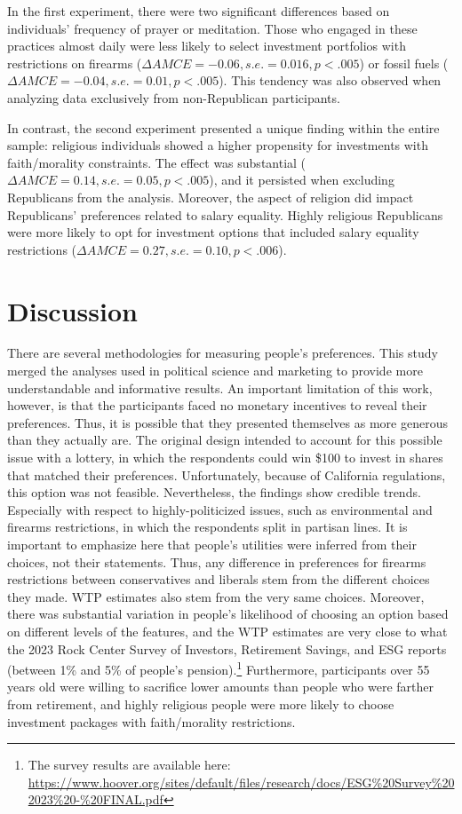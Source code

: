 \documentclass[
  12pt,
]{article}
\begin{document}
In the first experiment, there were two significant differences based on individuals' frequency of prayer or meditation. Those who engaged in these practices almost daily were less likely to select investment portfolios with restrictions on firearms (\(\Delta AMCE = -0.06, s.e. = 0.016, p<.005\)) or fossil fuels (\(\Delta AMCE = -0.04, s.e. = 0.01, p<.005\)). This tendency was also observed when analyzing data exclusively from non-Republican participants.

In contrast, the second experiment presented a unique finding within the entire sample: religious individuals showed a higher propensity for investments with faith/morality constraints. The effect was substantial (\(\Delta AMCE = 0.14, s.e. = 0.05, p<.005\)), and it persisted when excluding Republicans from the analysis. Moreover, the aspect of religion did impact Republicans' preferences related to salary equality. Highly religious Republicans were more likely to opt for investment options that included salary equality restrictions (\(\Delta AMCE = 0.27, s.e.=0.10, p<.006\)).

\hypertarget{discussion}{%
\section{Discussion}\label{discussion}}

There are several methodologies for measuring people's preferences. This study merged the analyses used in political science and marketing to provide more understandable and informative results. An important limitation of this work, however, is that the participants faced no monetary incentives to reveal their preferences. Thus, it is possible that they presented themselves as more generous than they actually are. The original design intended to account for this possible issue with a lottery, in which the respondents could win \$100 to invest in shares that matched their preferences. Unfortunately, because of California regulations, this option was not feasible. Nevertheless, the findings show credible trends. Especially with respect to highly-politicized issues, such as environmental and firearms restrictions, in which the respondents split in partisan lines. It is important to emphasize here that people's utilities were inferred from their choices, not their statements. Thus, any difference in preferences for firearms restrictions between conservatives and liberals stem from the different choices they made. WTP estimates also stem from the very same choices. Moreover, there was substantial variation in people's likelihood of choosing an option based on different levels of the features, and the WTP estimates are very close to what the 2023 Rock Center Survey of Investors, Retirement Savings, and ESG reports (between 1\% and 5\% of people's pension).\footnote{The survey results are available here: \url{https://www.hoover.org/sites/default/files/research/docs/ESG\%20Survey\%202023\%20-\%20FINAL.pdf}} Furthermore, participants over 55 years old were willing to sacrifice lower amounts than people who were farther from retirement, and highly religious people were more likely to choose investment packages with faith/morality restrictions.
\end{document}
